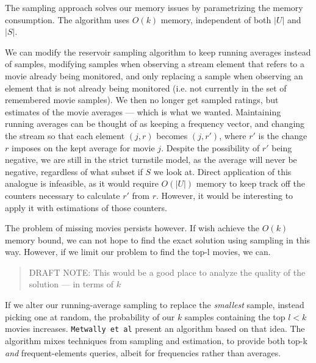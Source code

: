 The sampling approach solves our memory issues by parametrizing the memory
consumption. The algorithm uses $O(k)$ memory, independent of both $|U|$ and
$|S|$.

We can modify the reservoir sampling algorithm to keep running averages instead
of samples, modifying samples when observing a stream element that refers to a
movie already being monitored, and only replacing a sample when observing an
element that is not already being monitored (i.e. not currently in the set of
remembered movie samples). We then no longer get sampled ratings, but estimates
of the movie averages --- which is what we wanted. Maintaining running averages
can be thought of as keeping a frequency vector, and changing the stream so that
each element $(j, r)$ becomes $(j, r')$, where $r'$ is the change $r$ imposes on
the kept average for movie $j$. Despite the possibility of $r'$ being negative,
we are still in the strict turnstile model, as the average will never be
negative, regardless of what subset if $S$ we look at. Direct application of
this analogue is infeasible, as it would require $O(|U|)$ memory to keep
track off the counters necessary to calculate $r'$ from $r$. However, it would
be interesting to apply it with estimations of those counters.

The problem of missing movies persists however. If wish achieve the $O(k)$
memory bound, we can not hope to find the exact solution using sampling in this
way. However, if we limit our problem to find the top-l movies, we can.

\begin{quote}
	DRAFT NOTE: This would be a good place to analyze the quality of the
	solution --- in terms of $k$
\end{quote}

If we alter our running-average sampling to replace the \textit{smallest}
sample, instead picking one at random, the probability of our $k$ samples
containing the top $l<k$ movies increases. \texttt{Metwally et al} present an
algorithm based on that idea. The algorithm mixes techniques from sampling and
estimation, to provide both top-k \textit{and} frequent-elements queries, albeit
for frequencies rather than averages.

